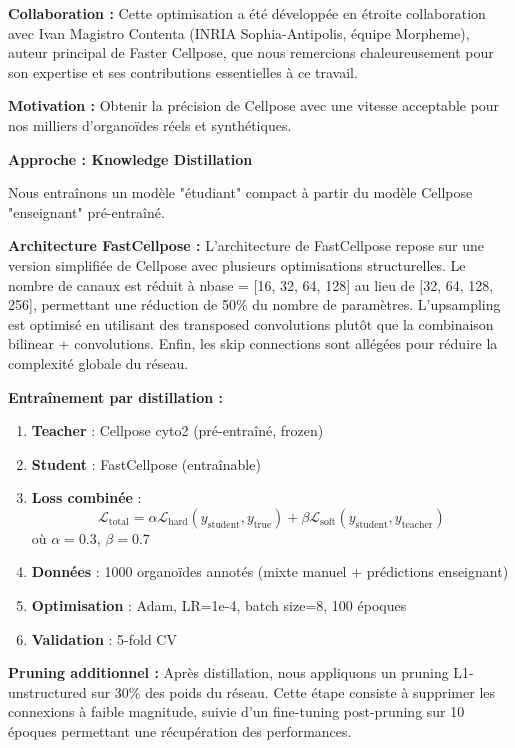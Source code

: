 \textbf{Collaboration :}
Cette optimisation a été développée en étroite collaboration avec Ivan Magistro Contenta (INRIA Sophia-Antipolis, équipe Morpheme), auteur principal de Faster Cellpose, que nous remercions chaleureusement pour son expertise et ses contributions essentielles à ce travail.

\textbf{Motivation :}
Obtenir la précision de Cellpose avec une vitesse acceptable pour nos milliers d'organoïdes réels et synthétiques.

\textbf{Approche : Knowledge Distillation}

Nous entraînons un modèle "étudiant" compact à partir du modèle Cellpose "enseignant" pré-entraîné.

\textbf{Architecture FastCellpose :}
L'architecture de FastCellpose repose sur une version simplifiée de Cellpose avec plusieurs optimisations structurelles. Le nombre de canaux est réduit à nbase = [16, 32, 64, 128] au lieu de [32, 64, 128, 256], permettant une réduction de 50\% du nombre de paramètres. L'upsampling est optimisé en utilisant des transposed convolutions plutôt que la combinaison bilinear + convolutions. Enfin, les skip connections sont allégées pour réduire la complexité globale du réseau.

\textbf{Entraînement par distillation :}
\begin{enumerate}
    \item \textbf{Teacher} : Cellpose cyto2 (pré-entraîné, frozen)
    \item \textbf{Student} : FastCellpose (entraînable)
    \item \textbf{Loss combinée} :
        \[
        \mathcal{L}_{\text{total}} = \alpha \mathcal{L}_{\text{hard}}(y_{\text{student}}, y_{\text{true}}) + \beta \mathcal{L}_{\text{soft}}(y_{\text{student}}, y_{\text{teacher}})
        \]
        où $\alpha = 0.3$, $\beta = 0.7$
    \item \textbf{Données} : 1000 organoïdes annotés (mixte manuel + prédictions enseignant)
    \item \textbf{Optimisation} : Adam, LR=1e-4, batch size=8, 100 époques
    \item \textbf{Validation} : 5-fold CV
\end{enumerate}

\textbf{Pruning additionnel :}
Après distillation, nous appliquons un pruning L1-unstructured sur 30\% des poids du réseau. Cette étape consiste à supprimer les connexions à faible magnitude, suivie d'un fine-tuning post-pruning sur 10 époques permettant une récupération des performances.

